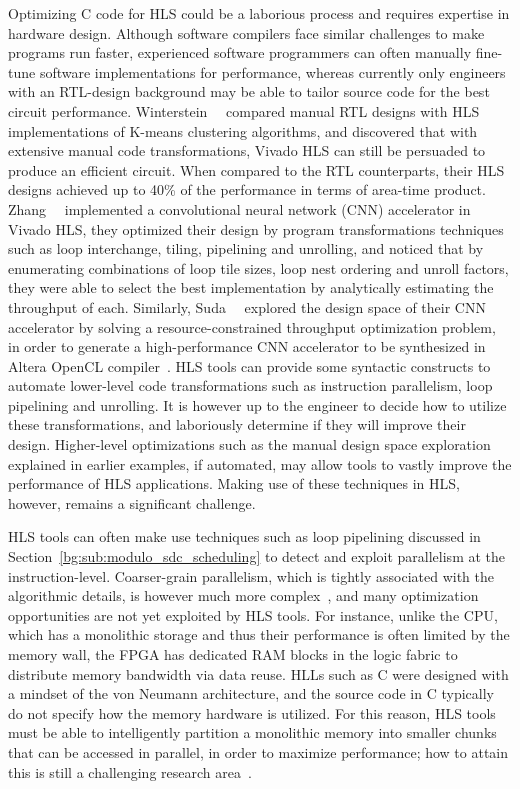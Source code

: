 Optimizing C code for HLS could be a laborious process and requires expertise
in hardware design.  Although software compilers face similar challenges to
make programs run faster, experienced software programmers can often manually
fine-tune software implementations for performance, whereas currently only
engineers with an RTL-design background may be able to tailor source code
for the best circuit performance.  Winterstein~\etal~\cite{felix13} compared
manual RTL designs with HLS implementations of K-means clustering algorithms,
and discovered that with extensive manual code transformations, Vivado HLS can
still be persuaded to produce an efficient circuit.  When compared to the RTL
counterparts, their HLS designs achieved up to 40\% of the performance in terms
of area-time product.  Zhang~\etal~\cite{zhang15} implemented a convolutional
neural network (CNN) accelerator in Vivado HLS, they optimized their design by
program transformations techniques such as loop interchange, tiling, pipelining
and unrolling, and noticed that by enumerating combinations of loop tile sizes,
loop nest ordering and unroll factors, they were able to select the best
implementation by analytically estimating the throughput of each.  Similarly,
Suda~\etal~\cite{suda16} explored the design space of their CNN accelerator
by solving a resource-constrained throughput optimization problem, in order
to generate a high-performance CNN accelerator to be synthesized in Altera
OpenCL compiler~\cite{aoc}.  HLS tools can provide some syntactic constructs
to automate lower-level code transformations such as instruction parallelism,
loop pipelining and unrolling.  It is however up to the engineer to decide
how to utilize these transformations, and laboriously determine if they will
improve their design.  Higher-level optimizations such as the manual design
space exploration explained in earlier examples, if automated, may allow tools
to vastly improve the performance of HLS applications.  Making use of these
techniques in HLS, however, remains a significant challenge.

HLS tools can often make use techniques such as loop pipelining discussed in
Section~\ref{bg:sub:modulo_sdc_scheduling} to detect and exploit parallelism at
the instruction-level.  Coarser-grain parallelism, which is tightly associated
with the algorithmic details, is however much more complex~\cite{nane15},
and many optimization opportunities are not yet exploited by HLS tools.  For
instance, unlike the CPU, which has a monolithic storage and thus their
performance is often limited by the memory wall, the FPGA has dedicated RAM
blocks in the logic fabric to distribute memory bandwidth via data reuse.  HLLs
such as C were designed with a mindset of the von Neumann architecture, and the
source code in C typically do not specify how the memory hardware is utilized.
For this reason, HLS tools must be able to intelligently partition a monolithic
memory into smaller chunks that can be accessed in parallel, in order to
maximize performance; how to attain this is still a challenging research
area~\cite{cong11, cong12, wang13, felix15}.

